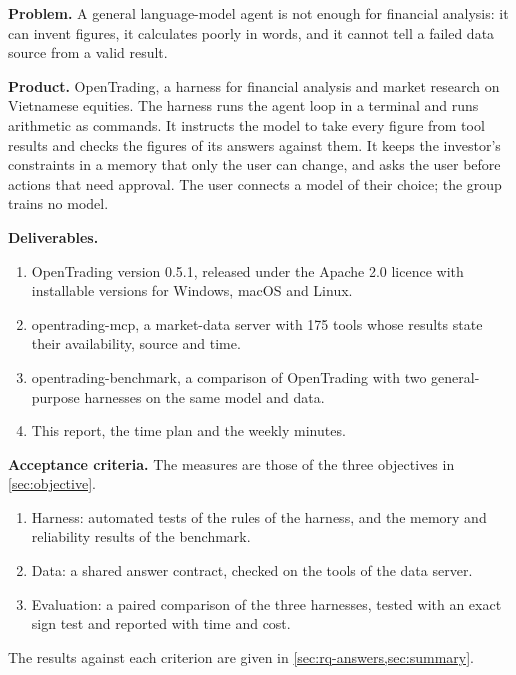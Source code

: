 \textbf{Problem.} A general language-model agent is not enough for financial analysis: it can invent figures, it calculates poorly in words, and it cannot tell a failed data source from a valid result.

\textbf{Product.} OpenTrading, a harness for financial analysis and market research on Vietnamese equities.
The harness runs the agent loop in a terminal and runs arithmetic as commands.
It instructs the model to take every figure from tool results and checks the figures of its answers against them.
It keeps the investor's constraints in a memory that only the user can change, and asks the user before actions that need approval.
The user connects a model of their choice; the group trains no model.

\textbf{Deliverables.}
\begin{enumerate}
  \item OpenTrading version 0.5.1, released under the Apache 2.0 licence with installable versions for Windows, macOS and Linux.
  \item opentrading-mcp, a market-data server with \num{175} tools whose results state their availability, source and time.
  \item opentrading-benchmark, a comparison of OpenTrading with two general-purpose harnesses on the same model and data.
  \item This report, the time plan and the weekly minutes.
\end{enumerate}

\textbf{Acceptance criteria.} The measures are those of the three objectives in \cref{sec:objective}.
\begin{enumerate}
  \item Harness: automated tests of the rules of the harness, and the memory and reliability results of the benchmark.
  \item Data: a shared answer contract, checked on the tools of the data server.
  \item Evaluation: a paired comparison of the three harnesses, tested with an exact sign test and reported with time and cost.
\end{enumerate}
The results against each criterion are given in \cref{sec:rq-answers,sec:summary}.
